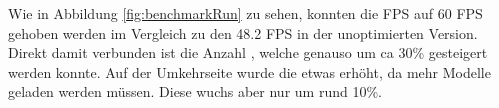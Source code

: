Wie in Abbildung \ref{fig:benchmarkRun} zu sehen, konnten die FPS auf 60 FPS gehoben werden im Vergleich zu den 48.2 FPS in der unoptimierten Version.
Direkt damit verbunden ist die Anzahl , welche genauso um ca 30\% gesteigert werden konnte. Auf der Umkehrseite wurde die  etwas erhöht, da mehr Modelle geladen werden müssen. Diese wuchs aber nur um rund 10\%.
